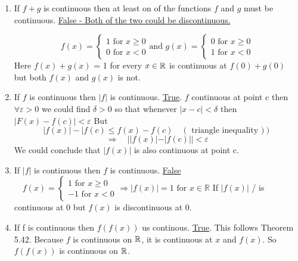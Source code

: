 \begin{numedquestion}
  \begin{enumerate}[label={(\arabic*)}]
    \item If $f+g$ is continuous then at least on of the functions $f$ and $g$ must be continuous. \newline \underline{False - Both of the two could be discontinuous. }
    
    \[f(x)=\left\{\begin{array}{l}
      1  \text { for } x \geqslant 0 \\
      0  \text { for } x < 0
      \end{array}\right.\text{and }
      g(x)=\left\{\begin{array}{l}
        0 \text { for } x \geqslant 0 \\
        1 \text { for } x < 0
        \end{array}\right.\]
      Here $f(x) + g(x)$ = 1 for every $x \in \mathbb{R}$ is continuous at $f(0) + g(0)$ but both $f(x)$ and $g(x)$ is not.
      
      \item If $f$ is continuous then $|f|$ is continuous. \underline{True}. \newline
      $f$ continuous at point c then $\forall \varepsilon>0$ we could find
      $\delta>0$ so that whenever $|x-c|<\delta$ then $|F(x)-f(c)|<\varepsilon$
      But
      \[
      |f(x)|-| f(c) \leqslant f(x)-f(c) \quad\left(\text { triangle inequality })\right)
      \]
      \[
      \Rightarrow \quad|| f(x)|-| f(c)||<\varepsilon
      \]
      We could conclude that $|f(x)|$ is also continuous at point c.

      \item If $|f|$ is continuous then $f$ is continuous. \underline{False} \newline
      $ \quad f(x)=\left\{\begin{array}{l}1 \text { for } x \geqslant 0 \\ -1 \text { for } x<0\end{array} \Rightarrow|f(x)|=1 \text { for } x \in \mathbb{R}\right.$
      If $|f(x)|$ / is continuous at 0 but $f(x)$ is discontinuous at 0.
      
      \item If f is continuous then $f(f(x))$ us continous. \underline{True}. \newline
            This follows Theorem 5.42. Because $f$ is continuous on $\mathbb{R}$, it is continuous at $x$ and $f(x)$. So $f(f(x))$ is continuous on $\mathbb{R}$.


\end{enumerate}
\end{numedquestion}
